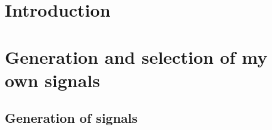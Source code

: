 \tableofcontents 
\newpage

\chapter{Introduction}
  \chapter{Generation and selection of my own signals} 
  \section{Generation of signals}
